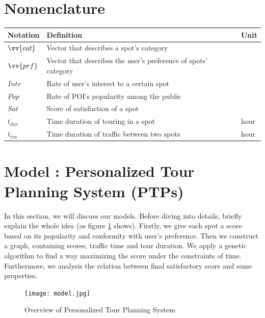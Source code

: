 \documentclass{mcmthesis}
\newcommand{\RNum}[1]{\uppercase\expandafter{\romannumeral #1\relax}}
\begin{document}
\section{Nomenclature}
  \begin{tabular}{lll}    %
    \toprule
    Notation & Definition & Unit \\
    \midrule
    $\vv{cat}$ & Vector that describes a spot's category & \\
    $\vv{prf}$ & Vector that describes the user's preference of spots' category & \\
    $Intr$ & Rate of user's interest to a certain spot & \\
    $Pop$ & Rate of POI's popularity among the public & \\
    $Sat$ & Score of satisfaction of a spot & \\
    $t_{dur}$ & Time duration of touring in a spot & hour \\
    $t_{tra}$ & Time duration of traffic between two spots & hour \\
    \bottomrule
  \end{tabular}


\section{Model \RNum{1}: Personalized Tour Planning System (PTPs)} \label{section:model1}
  In this section, we will discuss our models. Before diving into details, briefly explain the whole idea (as figure \ref{fig:model} shows). Firstly, we give each spot a score based on its popularity and conformity with user's preference. Then we construct a graph, containing scores, traffic time and tour duration. We apply a genetic algorithm to find a way maximizing the score under the constraints of time. Furthermore, we analysis the relation between final satisfactory score and some properties.
  \begin{figure}[h]
    \centering
    \texttt{[image: model.jpg]}
    \caption{Overview of Personalized Tour Planning System}
    \label{fig:model}
  \end{figure}
\end{document}
